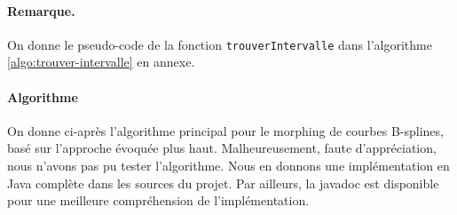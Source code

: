 \paragraph{Remarque. } On donne le pseudo-code de la fonction \texttt{trouverIntervalle} dans l'algorithme \ref{algo:trouver-intervalle} en annexe.

\paragraph{Algorithme} On donne ci-après l'algorithme principal pour le morphing de courbes B-splines, basé sur l'approche évoquée plus haut. Malheureusement,
faute d'appréciation, nous n'avons pas pu tester l'algorithme. Nous en donnons une implémentation en Java complète dans les sources du projet. Par ailleurs,
 la javadoc est disponible pour une meilleure compréhension de l'implémentation.
